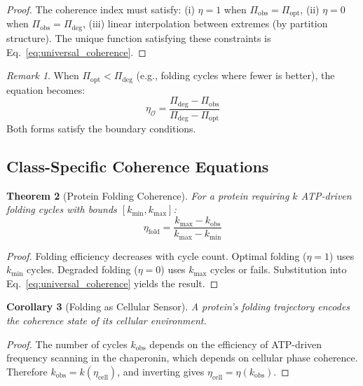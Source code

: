 \documentclass[aps,prd,twocolumn,superscriptaddress,floatfix,nofootinbib]{revtex4-2}
\newtheorem{theorem}{Theorem}[section]
\newtheorem{corollary}[theorem]{Corollary}
\theoremstyle{remark}
\newtheorem{remark}[theorem]{Remark}
\begin{document}
\begin{proof}
The coherence index must satisfy: (i) $\eta = 1$ when $\Pi_{\mathrm{obs}} = \Pi_{\mathrm{opt}}$, (ii) $\eta = 0$ when $\Pi_{\mathrm{obs}} = \Pi_{\mathrm{deg}}$, (iii) linear interpolation between extremes (by partition structure). The unique function satisfying these constraints is Eq.~\eqref{eq:universal_coherence}.
\end{proof}

\begin{remark}
When $\Pi_{\mathrm{opt}} < \Pi_{\mathrm{deg}}$ (e.g., folding cycles where fewer is better), the equation becomes:
\begin{equation}
\eta_{\mathcal{O}} = \frac{\Pi_{\mathrm{deg}} - \Pi_{\mathrm{obs}}}{\Pi_{\mathrm{deg}} - \Pi_{\mathrm{opt}}}
\end{equation}
Both forms satisfy the boundary conditions.
\end{remark}

\subsection{Class-Specific Coherence Equations}

\begin{theorem}[Protein Folding Coherence]
\label{thm:folding_coherence}
For a protein requiring $k$ ATP-driven folding cycles with bounds $[k_{\min}, k_{\max}]$:
\begin{equation}
\eta_{\mathrm{fold}} = \frac{k_{\max} - k_{\mathrm{obs}}}{k_{\max} - k_{\min}}
\end{equation}
\end{theorem}

\begin{proof}
Folding efficiency decreases with cycle count. Optimal folding ($\eta = 1$) uses $k_{\min}$ cycles. Degraded folding ($\eta = 0$) uses $k_{\max}$ cycles or fails. Substitution into Eq.~\eqref{eq:universal_coherence} yields the result.
\end{proof}

\begin{corollary}[Folding as Cellular Sensor]
\label{cor:folding_sensor}
A protein's folding trajectory encodes the coherence state of its cellular environment.
\end{corollary}

\begin{proof}
The number of cycles $k_{\mathrm{obs}}$ depends on the efficiency of ATP-driven frequency scanning in the chaperonin, which depends on cellular phase coherence. Therefore $k_{\mathrm{obs}} = k(\eta_{\mathrm{cell}})$, and inverting gives $\eta_{\mathrm{cell}} = \eta(k_{\mathrm{obs}})$.
\end{proof}
\end{document}
